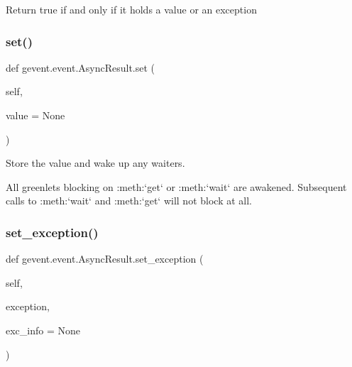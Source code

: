 \begin{DoxyVerb}Return true if and only if it holds a value or an exception\end{DoxyVerb}
 \mbox{\label{classgevent_1_1event_1_1_async_result_a4dc750ec7ee0f71beebe3861c7c9d9af}} 
\subsubsection{\texorpdfstring{set()}{set()}}
{\footnotesize\ttfamily def gevent.\+event.\+Async\+Result.\+set (\begin{DoxyParamCaption}\item[{}]{self,  }\item[{}]{value = {\ttfamily None} }\end{DoxyParamCaption})}

\begin{DoxyVerb}Store the value and wake up any waiters.

All greenlets blocking on :meth:`get` or :meth:`wait` are awakened.
Subsequent calls to :meth:`wait` and :meth:`get` will not block at all.
\end{DoxyVerb}
 \mbox{\label{classgevent_1_1event_1_1_async_result_a832be858eab0bbe7aa7ae343053c5555}} 
\subsubsection{\texorpdfstring{set\+\_\+exception()}{set\_exception()}}
{\footnotesize\ttfamily def gevent.\+event.\+Async\+Result.\+set\+\_\+exception (\begin{DoxyParamCaption}\item[{}]{self,  }\item[{}]{exception,  }\item[{}]{exc\+\_\+info = {\ttfamily None} }\end{DoxyParamCaption})}

